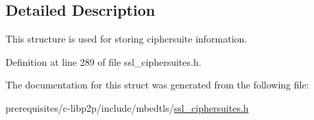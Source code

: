 \subsection{Detailed Description}
This structure is used for storing ciphersuite information. 

Definition at line 289 of file ssl\+\_\+ciphersuites.\+h.



The documentation for this struct was generated from the following file\+:\begin{DoxyCompactItemize}
\item 
prerequisites/c-\/libp2p/include/mbedtls/\mbox{\hyperlink{ssl__ciphersuites_8h}{ssl\+\_\+ciphersuites.\+h}}\end{DoxyCompactItemize}
